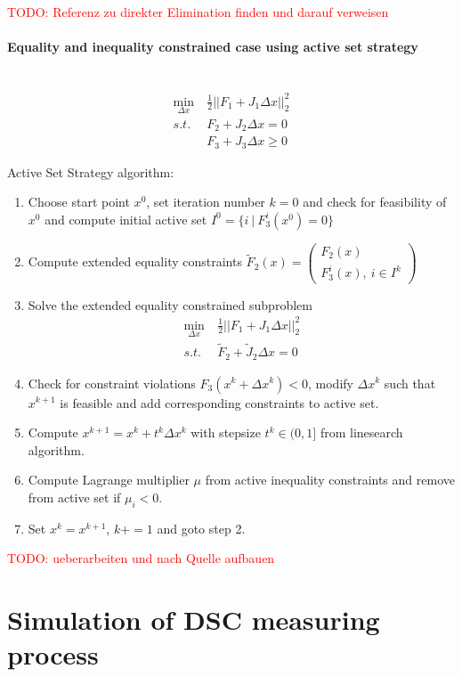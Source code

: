 \documentclass{scrartcl}[12pt, halfparskip]
\newcommand{\todo}[1]{\textcolor{red}{TODO: #1}}
\begin{document}
\todo{Referenz zu direkter Elimination finden und darauf verweisen}

\paragraph{Equality and inequality constrained case using active set strategy}\mbox{}\\
\begin{align}
\min_{\Delta x} & \ \frac{1}{2} || F_1 + J_1 \Delta x ||_2^2 \label{eq:numerical_soln_ineq_constrained_LSQ} \\
s.t. & \ F_2 + J_2 \Delta x = 0 \nonumber \\
&  \ F_3 + J_3 \Delta x \ge 0 \nonumber
\end{align}

Active Set Strategy algorithm:
\begin{enumerate}
	\item Choose start point $x^0$, set iteration number $k=0$ and check for feasibility of $x^0$ and compute  initial active set $I^0 = \{ i \ | \ F_3^i(x^0) = 0 \}$
	\item Compute extended equality constraints $\tilde{F}_2(x) = 
	\begin{pmatrix} 
	F_2(x) \\  
	F_3^i(x), \ i \in I^k
	\end{pmatrix}$
	\item Solve the extended equality constrained subproblem
	\begin{align}
		\min_{\Delta x} & \ \frac{1}{2} || F_1 + J_1 \Delta x ||_2^2 \nonumber \\
		s.t. & \ \tilde{F}_2 + \tilde{J}_2 \Delta x = 0 \nonumber
	\end{align}
	\item Check for constraint violations $F_3(x^k + \Delta x^k) < 0$, modify $\Delta x^k$ such that $x^{k+1}$ is feasible and add corresponding constraints to active set.
	\item Compute $x^{k+1} = x^k + t^k \Delta x^k$ with stepsize $t^k \in (0, 1]$ from linesearch algorithm.
	\item Compute Lagrange multiplier $\mu$ from active inequality constraints and remove from active set if $\mu_i < 0$.
	\item Set $x^k = x^{k+1}$, $k += 1$ and goto step 2.
\end{enumerate}

\todo{ueberarbeiten und nach Quelle aufbauen}

\newpage
\section{Simulation of DSC measuring process}
\end{document}
